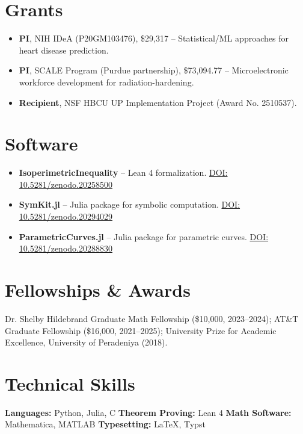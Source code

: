 \documentclass[11pt]{article}
\begin{document}
\section*{Grants}
\begin{itemize}
	\item \textbf{PI}, NIH IDeA (P20GM103476), \$29,317 -- Statistical/ML approaches for heart disease prediction.
	\item \textbf{PI}, SCALE Program (Purdue partnership), \$73,094.77 -- Microelectronic workforce development for radiation-hardening.
	\item \textbf{Recipient}, NSF HBCU UP Implementation Project (Award No. 2510537).
\end{itemize}

\section*{Software}
\begin{itemize}
	\item \textbf{IsoperimetricInequality} -- Lean 4 formalization. \href{https://doi.org/10.5281/zenodo.20258500}{DOI: 10.5281/zenodo.20258500}
	\item \textbf{SymKit.jl} -- Julia package for symbolic computation. \href{https://doi.org/10.5281/zenodo.20294029}{DOI: 10.5281/zenodo.20294029}
	\item \textbf{ParametricCurves.jl} -- Julia package for parametric curves. \href{https://doi.org/10.5281/zenodo.20288830}{DOI: 10.5281/zenodo.20288830}
\end{itemize}

\section*{Fellowships \& Awards}
Dr. Shelby Hildebrand Graduate Math Fellowship (\$10,000, 2023--2024); AT\&T Graduate Fellowship (\$16,000, 2021--2025); University Prize for Academic Excellence, University of Peradeniya (2018).

\section*{Technical Skills}
\textbf{Languages:} Python, Julia, C \quad \textbf{Theorem Proving:} Lean 4 \quad \textbf{Math Software:} Mathematica, MATLAB \quad \textbf{Typesetting:} LaTeX, Typst
\end{document}
